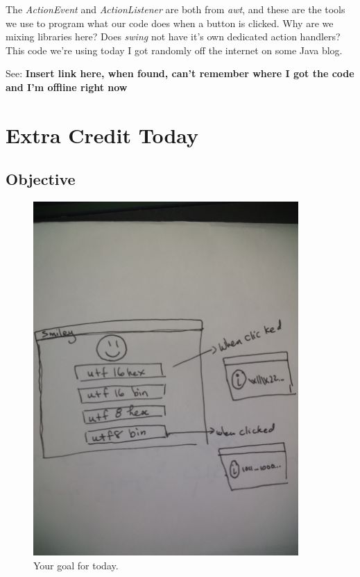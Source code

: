 \documentclass[12pt]{article}
\begin{document}
The \textit{ActionEvent} and \textit{ActionListener} are both from \textit{awt},
and these are the tools we use to program what our code does when a button is
clicked. Why are we mixing libraries here? Does \textit{swing} not have it's own
dedicated action handlers? This code we're using today I got randomly off the
internet on some Java blog.

See:
\textbf{Insert link here, when found, can't remember where I got the code and
I'm offline right now}

\section{Extra Credit Today}

\subsection{Objective}

\begin{figure}[h]
  \centering
    \includegraphics[width=0.9\textwidth]{Images/objective.jpg}
  \caption{Your goal for today.}
  \label{objective}
\end{figure}
\end{document}
